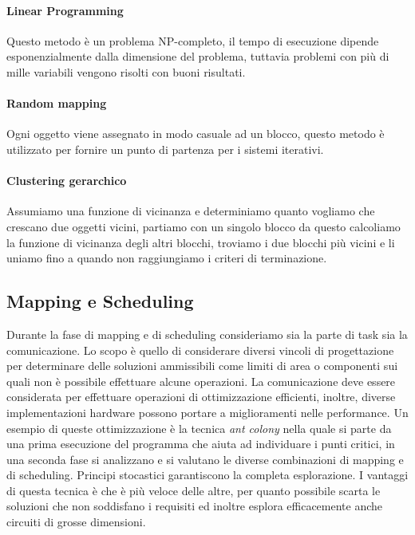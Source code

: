 \paragraph{Linear Programming}
Questo metodo è un problema NP-completo, il tempo di esecuzione dipende esponenzialmente dalla dimensione del problema, tuttavia problemi con più di mille variabili vengono risolti con buoni risultati.
\paragraph{Random mapping}
Ogni oggetto viene assegnato in modo casuale ad un blocco, questo metodo è utilizzato per fornire un punto di partenza per i sistemi iterativi.
\paragraph{Clustering gerarchico}
Assumiamo una funzione di vicinanza e determiniamo quanto vogliamo che crescano due oggetti vicini, partiamo con un singolo blocco da questo calcoliamo la funzione di vicinanza degli altri blocchi, troviamo i due blocchi più vicini e li uniamo fino a quando non raggiungiamo i criteri di terminazione.
\subsection{Mapping e Scheduling}
Durante la fase di mapping e di scheduling consideriamo sia la parte di task sia la comunicazione. Lo scopo è quello di considerare diversi vincoli di progettazione per determinare delle soluzioni ammissibili come limiti di area o componenti sui quali non è possibile effettuare alcune operazioni. La comunicazione deve essere considerata per effettuare operazioni di ottimizzazione efficienti, inoltre, diverse implementazioni hardware possono portare a miglioramenti nelle performance.
Un esempio di queste ottimizzazione è la tecnica \emph{ant colony} nella quale si parte da una prima esecuzione del programma che aiuta ad individuare i punti critici, in una seconda fase si analizzano e si valutano le diverse combinazioni di mapping e di scheduling. Principi stocastici garantiscono la completa esplorazione. I vantaggi di questa tecnica è che è più veloce delle altre, per quanto possibile scarta le soluzioni che non soddisfano i requisiti ed inoltre esplora efficacemente anche circuiti di grosse dimensioni.